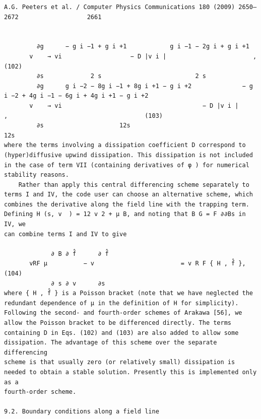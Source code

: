 \documentclass[a4paper]{article}
\newcommand{\gkwpagefont}{\fontsize{6.0pt}{7.55pt}\selectfont}
\begin{document}
\begin{Verbatim}[fontsize=\gkwpagefont]
                                                          A.G. Peeters et al. / Computer Physics Communications 180 (2009) 2650–2672                   2661


         ∂g      − g i −1 + g i +1            g i −1 − 2g i + g i +1
       v    → vi                   − D |v i |                        ,                                                                                (102)
         ∂s             2 s                          2 s
         ∂g      g i −2 − 8g i −1 + 8g i +1 − g i +2              − g i −2 + 4g i −1 − 6g i + 4g i +1 − g i +2
       v    → vi                                       − D |v i |                                              ,                                      (103)
         ∂s                     12s                                                 12s
where the terms involving a dissipation coefficient D correspond to (hyper)diffusive upwind dissipation. This dissipation is not included
in the case of term VII (containing derivatives of φ ) for numerical stability reasons.
    Rather than apply this central differencing scheme separately to terms I and IV, the code user can choose an alternative scheme, which
combines the derivative along the field line with the trapping term. Defining H (s, v  ) = 12 v 2 + μ B, and noting that B G = F ∂∂Bs in IV, we
can combine terms I and IV to give
                                             
             ∂ B ∂ f̂      ∂ f̂
       vRF μ          − v                        = v R F { H , f̂ },                                                                                 (104)
             ∂ s ∂ v      ∂s
where { H , f̂ } is a Poisson bracket (note that we have neglected the redundant dependence of μ in the definition of H for simplicity).
Following the second- and fourth-order schemes of Arakawa [56], we allow the Poisson bracket to be differenced directly. The terms
containing D in Eqs. (102) and (103) are also added to allow some dissipation. The advantage of this scheme over the separate differencing
scheme is that usually zero (or relatively small) dissipation is needed to obtain a stable solution. Presently this is implemented only as a
fourth-order scheme.

9.2. Boundary conditions along a field line


\end{Verbatim}
\end{document}
